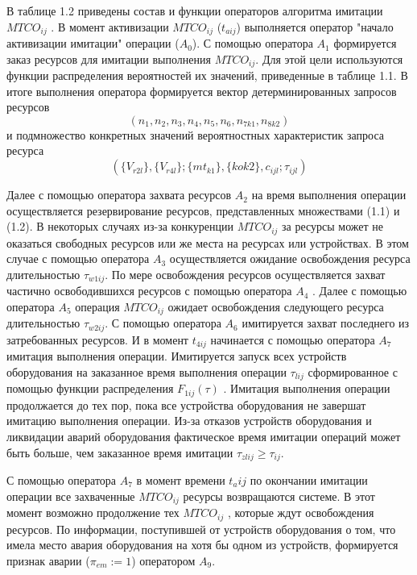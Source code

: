 В таблице 1.2 приведены состав и функции операторов алгоритма имитации $MTCO_{ij}$ . В момент активизации  $MTCO_{ij}$ ($t_{aij}$)   выполняется оператор "начало активизации имитации" операции  ($A_0$).
С помощью оператора $A_1$ формируется заказ ресурсов для имитации выполнения  $MTCO_{ij}$.  Для этой цели используются функции распределения вероятностей их значений, приведенные в таблице 1.1.  В итоге выполнения оператора   формируется вектор детерминированных запросов ресурсов
\begin{equation*}
		(n_1,n_2,n_3,n_4,n_5,n_6,n_{7k1},n_{8k2})
\end{equation*}
и подмножество конкретных значений вероятностных характеристик запроса ресурса
\begin{equation*}
        ( \{V_{r2l}\} , \{V_{r4l}\} ; \{mt_{k1}\} , \{ko{k2}\} , c_{ijl} ;\tau_{ijl} )
\end{equation*}

Далее с помощью оператора захвата ресурсов $A_2$  на время выполнения операции осуществляется резервирование ресурсов, представленных множествами (1.1) и (1.2). В некоторых случаях из-за конкуренции $MTCO_{ij}$ за ресурсы может не оказаться свободных ресурсов или же места на ресурсах или устройствах. В этом случае с помощью оператора $A_3$  осуществляется ожидание освобождения ресурса длительностью $\tau_{w1ij}$. По мере освобождения ресурсов осуществляется захват частично освободившихся ресурсов с помощью оператора $A_4$ . Далее с помощью оператора $A_5$ операция $MTCO_{ij}$ ожидает освобождения следующего ресурса длительностью $\tau_{w2ij}$.  С помощью оператора $A_6$ имитируется захват последнего из затребованных ресурсов. И в момент $t_{4ij}$  начинается с помощью оператора $A_7$ имитация выполнения операции. Имитируется запуск всех устройств оборудования на заказанное время выполнения операции $\tau_{lij}$ сформированное с помощью функции распределения $F_{1ij}(\tau)$ . Имитация выполнения операции продолжается до тех пор, пока все устройства оборудования не завершат имитацию выполнения операции. Из-за отказов устройств оборудования и ликвидации аварий  оборудования фактическое время имитации операций может быть больше, чем заказанное время имитации $\tau_{zlij} \geq \tau_{ij}$.

С помощью оператора $A_7$ в момент времени $t_aij$ по окончании имитации операции все захваченные $MTCO_{ij}$ ресурсы возвращаются системе. В этот момент возможно продолжение тех $MTCO_{ij}$ , которые ждут освобождения ресурсов. По информации, поступившей от устройств оборудования о том, что имела место авария оборудования на хотя бы одном из устройств, формируется признак аварии ($\pi_{em}:=1$) оператором $A_9$.

